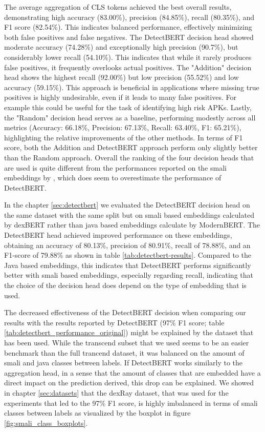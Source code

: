 The average aggregation of CLS tokens achieved the best overall results, 
demonstrating high accuracy (83.00\%), precision (84.85\%), recall (80.35\%), 
and F1 score (82.54\%). This indicates balanced performance, 
effectively minimizing both false positives and false negatives.
The DetectBERT decision head showed moderate accuracy (74.28\%) 
and exceptionally high precision (90.7\%), but considerably lower recall (54.10\%). 
This indicates that while it rarely produces false positives, 
it frequently overlooks actual positives. 
The "Addition" decision head shows the highest recall (92.00\%) but low precision 
(55.52\%) and low accuracy (59.15\%). 
This approach is beneficial in applications where missing true positives is highly 
undesirable, even if it leads to many false positives. For example this could be useful 
for the task of identifying high risk APKs.
Lastly, the "Random" decision head serves as a baseline, 
performing modestly across all metrics (Accuracy: 66.18\%, Precision: 67.13\%, 
Recall: 63.40\%, F1: 65.21\%), 
highlighting the relative improvements of the other methods.
In terms of F1 score, both the Addition and DetectBERT approach perform only slightly better 
than the Random approach.
Overall the ranking of the four decision heads that are used is quite different from the 
performances reported on the smali embeddings by \cite{detectbert}, which does seem to 
overestimate the performance of DetectBERT.

In the chapter \ref{sec:detectbert} we evaluated the DetectBERT decision head on the same 
dataset with the same split but on smali based embeddings calculated by dexBERT rather 
than java based embeddings calculate by ModernBERT. 
The DetectBERT head achieved improved performance on these embeddings, 
obtaining an accuracy of 80.13\%, precision of 80.91\%, recall of 78.88\%, and an F1-score of 79.88\% 
as shown in table \ref{tab:detectbert-results}.
Compared to the Java based embeddings, this indicates that DetectBERT performs significantly better 
with smali based embeddings, especially regarding recall, 
indicating that the choice of the decision head does depend on the type of embedding that is used.

The decreased effectiveness of the DetectBERT decision when comparing our results with the results 
reported by DetectBERT (97\% F1 score; table \ref{tab:detectbert_performance_original}) might be explained 
by the dataset that has been used. While the transcend subset that we used seems to be an easier benchmark 
than the full trancend dataset, it was balanced on the amount of smali and java classes between labels.
If DetectBERT works similarly to the aggregation head, in a sense that the amount of classes 
that are embedded have a direct impact on the prediction derived, this drop can be explained.
We showed in chapter \ref{sec:datasets} that the dexRay dataset, that was used for the experiments that 
led to the 97\% F1 score, is highly imbalanced in terms of smali classes between labels as visualized by the 
boxplot in figure \ref{fig:smali_class_boxplots}.